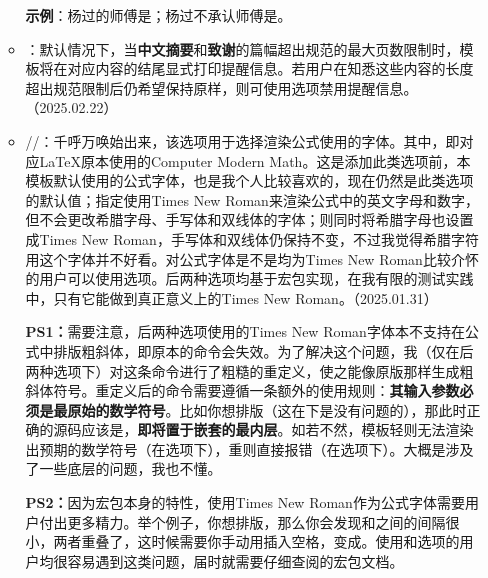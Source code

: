 \documentclass[print, doctor, vlined]{DissertUESTC}
\begin{document}
\begin{itemize}
\begin{itemize}
			\textbf{示例}：杨过的师傅是；杨过不承认师傅是。
			
			\item {}：默认情况下，当\textbf{中文摘要}和\textbf{致谢}的篇幅超出规范的最大页数限制时，模板将在对应内容的结尾显式打印提醒信息。若用户在知悉这些内容的长度超出规范限制后仍希望保持原样，则可使用选项禁用提醒信息。（2025.02.22）
			
			\item {}//：千呼万唤始出来，该选项用于选择渲染公式使用的字体。其中，即对应LaTeX原本使用的Computer Modern Math。这是添加此类选项前，本模板默认使用的公式字体，也是我个人比较喜欢的，现在仍然是此类选项的默认值；指定使用Times New Roman来渲染公式中的英文字母和数字，但不会更改希腊字母、手写体和双线体的字体；则同时将希腊字母也设置成Times New Roman，手写体和双线体仍保持不变，不过我觉得希腊字符用这个字体并不好看。对公式字体是不是均为Times New Roman比较介怀的用户可以使用选项。后两种选项均基于\href{https://mirrors.nju.edu.cn/CTAN/macros/xetex/latex/mathspec/mathspec.pdf}{}宏包实现，在我有限的测试实践中，只有它能做到真正意义上的Times New Roman。（2025.01.31）
			
			\textbf{PS1：}需要注意，后两种选项使用的Times New Roman字体本不支持在公式中排版粗斜体，即原本的命令会失效。为了解决这个问题，我（仅在后两种选项下）对这条命令进行了粗糙的重定义，使之能像原版那样生成粗斜体符号。重定义后的命令需要遵循一条额外的使用规则：\textbf{其输入参数必须是最原始的数学符号}。比如你想排版（这在下是没有问题的），那此时正确的源码应该是，\textbf{即将置于嵌套的最内层}。如若不然，模板轻则无法渲染出预期的数学符号（在选项下），重则直接报错（在选项下）。大概是涉及了一些底层的问题，我也不懂。

			\textbf{PS2：}因为\href{https://mirrors.nju.edu.cn/CTAN/macros/xetex/latex/mathspec/mathspec.pdf}{}宏包本身的特性，使用Times New Roman作为公式字体需要用户付出更多精力。举个例子，你想排版，那么你会发现和之间的间隔很小，两者重叠了，这时候需要你手动用插入空格，变成。使用和选项的用户均很容易遇到这类问题，届时就需要仔细查阅\href{https://mirrors.nju.edu.cn/CTAN/macros/xetex/latex/mathspec/mathspec.pdf}{}的宏包文档。


\end{itemize}
\end{itemize}
\end{document}
